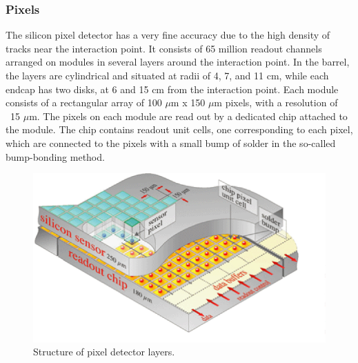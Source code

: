 \subsubsection{Pixels}
The silicon pixel detector has a very fine accuracy
due to the high density of tracks near the interaction point.  
It consists of 65 million readout channels 
arranged on modules in several layers around the interaction point.
In the barrel, the layers are cylindrical and situated at
radii of 4, 7, and 11 cm, 
while each endcap has two disks, at 6 and 15 cm from the
interaction point. 
Each module consists of a rectangular array of 100 $\mu$m x 150 $\mu$m pixels, 
with a resolution of ~15 $\mu$m.  
The pixels on each module are read out by a dedicated chip attached 
to the module. 
The chip contains readout unit cells, one corresponding to each pixel,
which are connected to the pixels with a small bump of solder 
in the so-called bump-bonding method.  

 \begin{figure}[htb]
  \begin{center}
    \includegraphics[width=360pt]{Figures/tracker-Pixelement.png}
  \end{center}
  \caption[Structure of pixel detector layers]{Structure of pixel detector layers.}
  \label{fig:PixelLayers}
 \end{figure}

